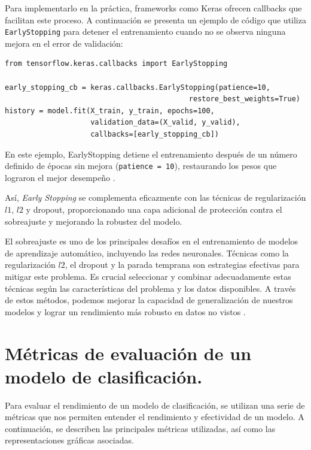 Para implementarlo en la práctica, frameworks como Keras ofrecen callbacks que facilitan este proceso. A continuación se presenta un ejemplo de código que utiliza \lstinline|EarlyStopping| para detener el entrenamiento cuando no se observa ninguna mejora en el error de validación:


\lstset{language=Python}
\begin{lstlisting}
from tensorflow.keras.callbacks import EarlyStopping

early_stopping_cb = keras.callbacks.EarlyStopping(patience=10,
                                           restore_best_weights=True)
history = model.fit(X_train, y_train, epochs=100,
                    validation_data=(X_valid, y_valid),
                    callbacks=[early_stopping_cb])
\end{lstlisting}

En este ejemplo, EarlyStopping detiene el entrenamiento después de un número definido de épocas sin mejora (\lstinline|patience = 10|), restaurando los pesos que lograron el mejor desempeño \citep{geron2022hands}.

Así, \textit{Early Stopping} se complementa eficazmente con las técnicas de regularización $l1$, $l2$ y dropout, proporcionando una capa adicional de protección contra el sobreajuste y mejorando la robustez del modelo.

\bigskip


El sobreajuste es uno de los principales desafíos en el entrenamiento de modelos de aprendizaje automático, incluyendo las redes neuronales. Técnicas como la regularización \(l2\), el dropout y la parada temprana son estrategias efectivas para mitigar este problema. Es crucial seleccionar y combinar adecuadamente estas técnicas según las características del problema y los datos disponibles. A través de estos métodos, podemos mejorar la capacidad de generalización de nuestros modelos y lograr un rendimiento más robusto en datos no vistos \citep{geron2022hands, pajares2021aprendizaje}.












\section{Métricas de evaluación de un modelo de clasificación.}

Para evaluar el rendimiento de un modelo de clasificación, se utilizan una serie de métricas que nos permiten entender el rendimiento y efectividad de un modelo. A continuación, se describen las principales métricas utilizadas, así como las representaciones gráficas asociadas.

